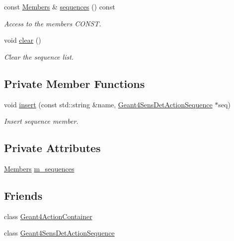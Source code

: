 \begin{DoxyCompactItemize}
const \hyperlink{class_d_d4hep_1_1_simulation_1_1_geant4_sens_det_sequences_a2266138a517dd9b784af9234312fdd12}{Members} \& \hyperlink{class_d_d4hep_1_1_simulation_1_1_geant4_sens_det_sequences_a48953184c7be01b66b1d6ecc69e99eaf}{sequences} () const
\begin{DoxyCompactList}\small\item\em Access to the members C\+O\+N\+ST. \end{DoxyCompactList}\item 
void \hyperlink{class_d_d4hep_1_1_simulation_1_1_geant4_sens_det_sequences_ad30860ebb23e7fbbaf18c8a7194ae6cc}{clear} ()
\begin{DoxyCompactList}\small\item\em Clear the sequence list. \end{DoxyCompactList}\end{DoxyCompactItemize}
\subsection*{Private Member Functions}
\begin{DoxyCompactItemize}
\item 
void \hyperlink{class_d_d4hep_1_1_simulation_1_1_geant4_sens_det_sequences_a94c88487954aa5877af76b61d5f5ed20}{insert} (const std\+::string \&name, \hyperlink{class_d_d4hep_1_1_simulation_1_1_geant4_sens_det_action_sequence}{Geant4\+Sens\+Det\+Action\+Sequence} $\ast$seq)
\begin{DoxyCompactList}\small\item\em Insert sequence member. \end{DoxyCompactList}\end{DoxyCompactItemize}
\subsection*{Private Attributes}
\begin{DoxyCompactItemize}
\item 
\hyperlink{class_d_d4hep_1_1_simulation_1_1_geant4_sens_det_sequences_a2266138a517dd9b784af9234312fdd12}{Members} \hyperlink{class_d_d4hep_1_1_simulation_1_1_geant4_sens_det_sequences_a913b05e77e69effeeafbd0f7a604cd70}{m\+\_\+sequences}
\end{DoxyCompactItemize}
\subsection*{Friends}
\begin{DoxyCompactItemize}
\item 
class \hyperlink{class_d_d4hep_1_1_simulation_1_1_geant4_sens_det_sequences_a17a3e017d1d61a4f615d4e8eef0f98cb}{Geant4\+Action\+Container}
\item 
class \hyperlink{class_d_d4hep_1_1_simulation_1_1_geant4_sens_det_sequences_a0dd78d992a2c8dccba1ab80d814020cc}{Geant4\+Sens\+Det\+Action\+Sequence}
\end{DoxyCompactItemize}


